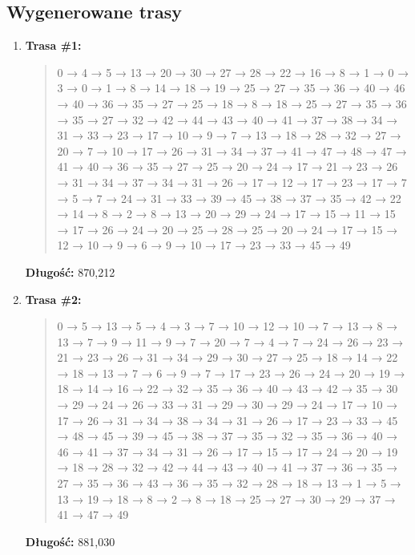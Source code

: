 \documentclass{article}
\begin{document}
\subsection*{Wygenerowane trasy}

\begin{enumerate}
    \item \textbf{Trasa \#1:}
    \begin{quote}
        0 → 4 → 5 → 13 → 20 → 30 → 27 → 28 → 22 → 16 → 8 → 1 → 0 → 3 → 0 → 1 → 8 → 14 → 18 → 19 → 25 → 27 → 35 → 36 → 40 → 46 → 40 → 36 → 35 → 27 → 25 → 18 → 8 → 18 → 25 → 27 → 35 → 36 → 35 → 27 → 32 → 42 → 44 → 43 → 40 → 41 → 37 → 38 → 34 → 31 → 33 → 23 → 17 → 10 → 9 → 7 → 13 → 18 → 28 → 32 → 27 → 20 → 7 → 10 → 17 → 26 → 31 → 34 → 37 → 41 → 47 → 48 → 47 → 41 → 40 → 36 → 35 → 27 → 25 → 20 → 24 → 17 → 21 → 23 → 26 → 31 → 34 → 37 → 34 → 31 → 26 → 17 → 12 → 17 → 23 → 17 → 7 → 5 → 7 → 24 → 31 → 33 → 39 → 45 → 38 → 37 → 35 → 42 → 22 → 14 → 8 → 2 → 8 → 13 → 20 → 29 → 24 → 17 → 15 → 11 → 15 → 17 → 26 → 24 → 20 → 25 → 28 → 25 → 20 → 24 → 17 → 15 → 12 → 10 → 9 → 6 → 9 → 10 → 17 → 23 → 33 → 45 → 49
    \end{quote}
    \textbf{Długość:} 870{,}212

    \item \textbf{Trasa \#2:}
    \begin{quote}
        0 → 5 → 13 → 5 → 4 → 3 → 7 → 10 → 12 → 10 → 7 → 13 → 8 → 13 → 7 → 9 → 11 → 9 → 7 → 20 → 7 → 4 → 7 → 24 → 26 → 23 → 21 → 23 → 26 → 31 → 34 → 29 → 30 → 27 → 25 → 18 → 14 → 22 → 18 → 13 → 7 → 6 → 9 → 7 → 17 → 23 → 26 → 24 → 20 → 19 → 18 → 14 → 16 → 22 → 32 → 35 → 36 → 40 → 43 → 42 → 35 → 30 → 29 → 24 → 26 → 33 → 31 → 29 → 30 → 29 → 24 → 17 → 10 → 17 → 26 → 31 → 34 → 38 → 34 → 31 → 26 → 17 → 23 → 33 → 45 → 48 → 45 → 39 → 45 → 38 → 37 → 35 → 32 → 35 → 36 → 40 → 46 → 41 → 37 → 34 → 31 → 26 → 17 → 15 → 17 → 24 → 20 → 19 → 18 → 28 → 32 → 42 → 44 → 43 → 40 → 41 → 37 → 36 → 35 → 27 → 35 → 36 → 43 → 36 → 35 → 32 → 28 → 18 → 13 → 1 → 5 → 13 → 19 → 18 → 8 → 2 → 8 → 18 → 25 → 27 → 30 → 29 → 37 → 41 → 47 → 49
    \end{quote}
    \textbf{Długość:} 881{,}030


\end{enumerate}
\end{document}
